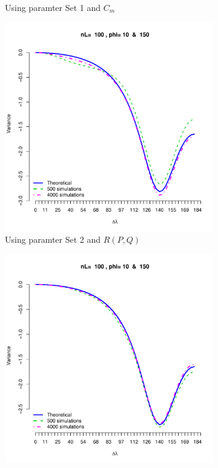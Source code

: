 \begin{figure}[H]
\begin{subfigure}{.5\textwidth}
		\caption{Using paramter Set 1 and $C_m$}
		\label{fig:sfig2}
	\end{subfigure}
	\begin{subfigure}{.5\textwidth}
		\centering
		\includegraphics[width=1\linewidth]{graphs/results_variogram_model1_rpq_2}
		\caption{Using paramter Set 2 and $R(P,Q)$}
		\label{fig:sfig1}
	\end{subfigure}
	\begin{subfigure}{.5\textwidth}
		\centering
		\includegraphics[width=1\linewidth]{graphs/results_variogram_model1_2}

\end{subfigure}
\end{figure}
